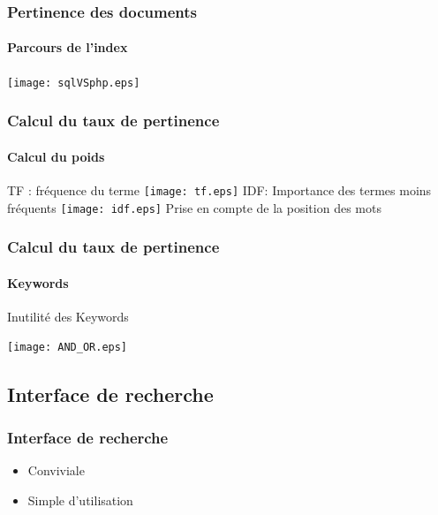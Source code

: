 \documentclass{beamer}
\begin{document}
    \begin{frame}
     \frametitle{Pertinence des documents}
     \framesubtitle{Parcours de l'index}
     \begin{center}
     \texttt{[image: sqlVSphp.eps]}
     \end{center}

    \end{frame}
    
     \begin{frame}
     \frametitle{Calcul du taux de pertinence}
     \framesubtitle{Calcul du poids}
     TF : fréquence du terme \hfill
     \texttt{[image: tf.eps]}
     \medbreak
     IDF: Importance des termes moins fréquents
     \hfill
     \texttt{[image: idf.eps]}
     \medbreak
     Prise en compte de la position des mots
    \end{frame}
    
    \begin{frame}
     \frametitle{Calcul du taux de pertinence}
     \framesubtitle{Keywords}
     \begin{center}
      Inutilité des Keywords
     \end{center}

     
     \begin{center}
      
       \texttt{[image: AND\_OR.eps]}
     \end{center}


    \end{frame}

    
    \subsection{Interface de recherche}  
    \begin{frame}
     \frametitle{Interface de recherche}
     \begin{itemize}
      \item Conviviale
      \item Simple d'utilisation
     \end{itemize}
    \end{frame}
    
    

    
    
    
    
\end{document}
